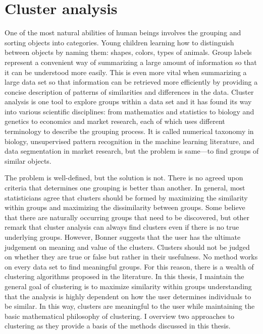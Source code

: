 \section{Cluster analysis}
One of the most natural abilities of human beings involves the grouping and sorting objects into categories. Young children learning how to distinguish between objects by naming them: shapes, colors, types of animals. Group labels represent a convenient way of summarizing a large amount of information so that it can be understood more easily. This is even more vital when summarizing a large data set so that information can be retrieved more efficiently by providing a concise description of patterns of similarities and differences in the data. Cluster analysis is one tool to explore groups within a data set and it has found its way into various scientific disciplines: from mathematics and statistics to biology and genetics to economics and market research, each of which uses different terminology to describe the grouping process. It is called numerical taxonomy in biology, unsupervised pattern recognition in the machine learning literature, and data segmentation in market research, but the problem is same---to find groups of similar objects.

The problem is well-defined, but the solution is not. There is no agreed upon criteria that determines one grouping is better than another. In general, most statisticians agree that clusters should be formed by maximizing the similarity within groups and maximizing the dissimilarity between groups. Some believe that there are naturally occurring groups that need to be discovered, but other remark that cluster analysis can always find clusters even if there is no true underlying groups. However, Bonner \cite{bonner1964} suggests that the user has the ultimate judgement on meaning and value of the clusters. Clusters should not be judged on whether they are true or false but rather in their usefulness. No method works on every data set to find meaningful groups. For this reason, there is a wealth of clustering algorithms proposed in the literature. In this thesis, I maintain the general goal of clustering is to maximize similarity within groups understanding that the analysis is highly dependent on how the user determines individuals to be similar. In this way, clusters are meaningful to the user while maintaining the basic mathematical philosophy of clustering.  I overview two approaches to clustering as they provide a basis of the methods discussed in this thesis. 

